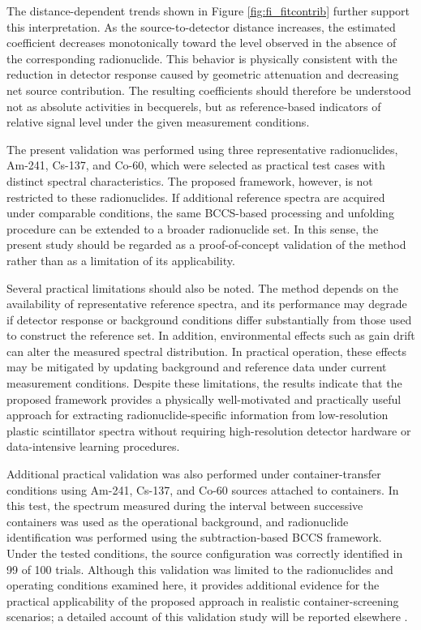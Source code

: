 \documentclass[fleqn, 10pt]{wlscirep}
\begin{document}
The distance-dependent trends shown in Figure \ref{fig:fi_fitcontrib} further support this interpretation. As the source-to-detector distance increases, the estimated coefficient decreases monotonically toward the level observed in the absence of the corresponding radionuclide. This behavior is physically consistent with the reduction in detector response caused by geometric attenuation and decreasing net source contribution. The resulting coefficients should therefore be understood not as absolute activities in becquerels, but as reference-based indicators of relative signal level under the given measurement conditions.

The present validation was performed using three representative radionuclides, Am-241, Cs-137, and Co-60, which were selected as practical test cases with distinct spectral characteristics. The proposed framework, however, is not restricted to these radionuclides. If additional reference spectra are acquired under comparable conditions, the same BCCS-based processing and unfolding procedure can be extended to a broader radionuclide set. In this sense, the present study should be regarded as a proof-of-concept validation of the method rather than as a limitation of its applicability.

Several practical limitations should also be noted. The method depends on the availability of representative reference spectra, and its performance may degrade if detector response or background conditions differ substantially from those used to construct the reference set. In addition, environmental effects such as gain drift can alter the measured spectral distribution. In practical operation, these effects may be mitigated by updating background and reference data under current measurement conditions. Despite these limitations, the results indicate that the proposed framework provides a physically well-motivated and practically useful approach for extracting radionuclide-specific information from low-resolution plastic scintillator spectra without requiring high-resolution detector hardware or data-intensive learning procedures.

Additional practical validation was also performed under container-transfer conditions using Am-241, Cs-137, and Co-60 sources attached to containers. In this test, the spectrum measured during the interval between successive containers was used as the operational background, and radionuclide identification was performed using the subtraction-based BCCS framework. Under the tested conditions, the source configuration was correctly identified in 99 of 100 trials. Although this validation was limited to the radionuclides and operating conditions examined here, it provides additional evidence for the practical applicability of the proposed approach in realistic container-screening scenarios; a detailed account of this validation study will be reported elsewhere \cite{Unpublished1}.
\end{document}
